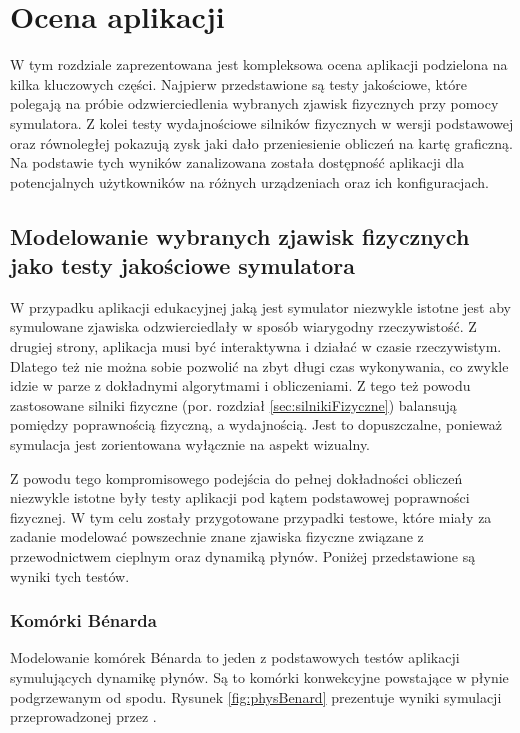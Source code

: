 \chapter{Ocena aplikacji}
\label{cha:ocena}

W tym rozdziale zaprezentowana jest kompleksowa ocena aplikacji \en podzielona
na kilka kluczowych części. Najpierw przedstawione są testy jakościowe, które
polegają na próbie odzwierciedlenia wybranych zjawisk fizycznych przy pomocy
symulatora. Z kolei testy wydajnościowe silników fizycznych w wersji
podstawowej oraz równoległej pokazują zysk jaki dało przeniesienie obliczeń na
kartę graficzną. Na podstawie tych wyników zanalizowana została dostępność
aplikacji dla potencjalnych użytkowników na różnych urządzeniach oraz ich
konfiguracjach.

\section{Modelowanie wybranych zjawisk fizycznych jako testy jakościowe symulatora}

W przypadku aplikacji edukacyjnej jaką jest symulator \en niezwykle istotne
jest aby symulowane zjawiska odzwierciedlały w sposób  wiarygodny
rzeczywistość. Z drugiej strony, aplikacja musi być interaktywna i
działać w czasie rzeczywistym. Dlatego też nie można sobie pozwolić na zbyt
długi czas wykonywania, co zwykle idzie w parze z dokładnymi algorytmami i
obliczeniami. Z tego też powodu zastosowane silniki fizyczne (por. rozdział
\ref{sec:silnikiFizyczne}) balansują pomiędzy poprawnością fizyczną, a
wydajnością. Jest to dopuszczalne, ponieważ symulacja jest zorientowana
wyłącznie na aspekt wizualny.

Z powodu tego kompromisowego podejścia do pełnej dokładności obliczeń niezwykle
istotne były testy aplikacji pod kątem podstawowej poprawności fizycznej. W tym
celu zostały przygotowane przypadki testowe, które miały za zadanie modelować
powszechnie znane zjawiska fizyczne związane z przewodnictwem cieplnym oraz
dynamiką płynów. Poniżej przedstawione są wyniki tych testów.

\subsection{Komórki Bénarda}

Modelowanie komórek Bénarda to jeden z podstawowych testów aplikacji
symulujących dynamikę płynów. Są to komórki konwekcyjne powstające w płynie
podgrzewanym od spodu. Rysunek \ref{fig:physBenard} prezentuje wyniki symulacji
przeprowadzonej przez \en.

